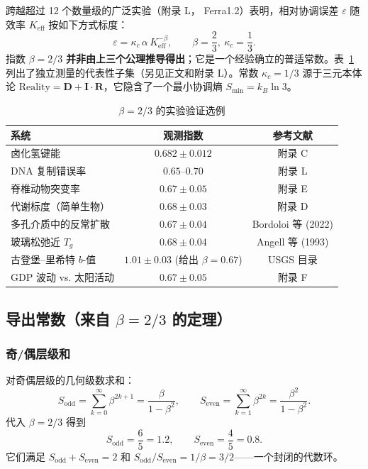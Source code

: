 \documentclass[11pt,a4paper]{article}
\begin{document}
	跨越超过 12 个数量级的广泛实验（附录 L， Ferra1.2）表明，相对协调误差 \(\varepsilon\) 随效率 \(K_{\mathrm{eff}}\) 按如下方式标度：
	\[
	\varepsilon = \kappa_c \, \alpha \, K_{\mathrm{eff}}^{-\beta}, \qquad \boxed{\beta = \frac{2}{3}},\ \kappa_c = \frac{1}{3}.
	\]
	指数 \(\beta = 2/3\) \textbf{并非由上三个公理推导得出}；它是一个经验确立的普适常数。表~\ref{tab:beta-evidence} 列出了独立测量的代表性子集（另见正文和附录 L）。常数 \(\kappa_c = 1/3\) 源于三元本体论 \(\text{Reality} = \mathbf{D} + \mathbf{I}\!\cdot\!\mathbf{R}\)，它隐含了一个最小协调熵 \(S_{\min}=k_B\ln 3\)。
	
	\begin{table}[H]
		\centering
		\caption{\(\beta = 2/3\) 的实验验证选例}
		\label{tab:beta-evidence}
		\small
		\begin{tabular}{l c c}
			\toprule
			\textbf{系统} & \textbf{观测指数} & \textbf{参考文献} \\
			\midrule
			卤化氢键能 & \(0.682 \pm 0.012\) & 附录 C \\
			DNA 复制错误率 & \(0.65\)–\(0.70\) & 附录 L \\
			脊椎动物突变率 & \(0.67 \pm 0.05\) & 附录 E \\
			代谢标度（简单生物） & \(0.68 \pm 0.03\) & 附录 D \\
			多孔介质中的反常扩散 & \(0.67 \pm 0.04\) & Bordoloi 等 (2022) \\
			玻璃松弛近 \(T_g\) & \(0.68 \pm 0.04\) & Angell 等 (1993) \\
			古登堡–里希特 \(b\)-值 & \(1.01 \pm 0.03\) (给出 \(\beta=0.67\)) & USGS 目录 \\
			GDP 波动 vs. 太阳活动 & \(0.67 \pm 0.05\) & 附录 F \\
			\bottomrule
		\end{tabular}
	\end{table}
	
	\subsection{导出常数（来自 \(\beta = 2/3\) 的定理）}
	
	\subsubsection{奇/偶层级和}
	对奇偶层级的几何级数求和：
	\[
	S_{\mathrm{odd}} = \sum_{k=0}^{\infty} \beta^{2k+1} = \frac{\beta}{1-\beta^2},\qquad
	S_{\mathrm{even}} = \sum_{k=1}^{\infty} \beta^{2k} = \frac{\beta^2}{1-\beta^2}.
	\]
	代入 \(\beta = 2/3\) 得到
	\[
	\boxed{S_{\mathrm{odd}} = \frac{6}{5}=1.2,\qquad S_{\mathrm{even}} = \frac{4}{5}=0.8}.
	\]
	它们满足 \(S_{\mathrm{odd}}+S_{\mathrm{even}}=2\) 和 \(S_{\mathrm{odd}}/S_{\mathrm{even}} = 1/\beta = 3/2\)——一个封闭的代数环。
	
\end{document}
